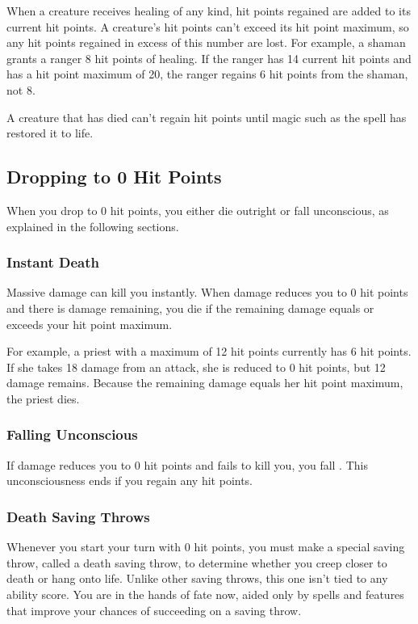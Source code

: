 When a creature receives healing of any kind, hit points regained are added to its current hit points. A creature's hit points can't exceed its hit point maximum, so any hit points regained in excess of this number are lost. For example, a shaman grants a ranger 8 hit points of healing. If the ranger has 14 current hit points and has a hit point maximum of 20, the ranger regains 6 hit points from the shaman, not 8.

A creature that has died can't regain hit points until magic such as the  spell has restored it to life.

\subsection{Dropping to 0 Hit Points}

When you drop to 0 hit points, you either die outright or fall unconscious, as explained in the following sections.

\subsubsection{Instant Death}

Massive damage can kill you instantly. When damage reduces you to 0 hit points and there is damage remaining, you die if the remaining damage equals or exceeds your hit point maximum.

For example, a priest with a maximum of 12 hit points currently has 6 hit points. If she takes 18 damage from an attack, she is reduced to 0 hit points, but 12 damage remains. Because the remaining damage equals her hit point maximum, the priest dies.

\subsubsection{Falling Unconscious}

If damage reduces you to 0 hit points and fails to kill you, you fall . This unconsciousness ends if you regain any hit points.

\subsubsection{Death Saving Throws}

Whenever you start your turn with 0 hit points, you must make a special saving throw, called a death saving throw, to determine whether you creep closer to death or hang onto life. Unlike other saving throws, this one isn't tied to any ability score. You are in the hands of fate now, aided only by spells and features that improve your chances of succeeding on a saving throw.

